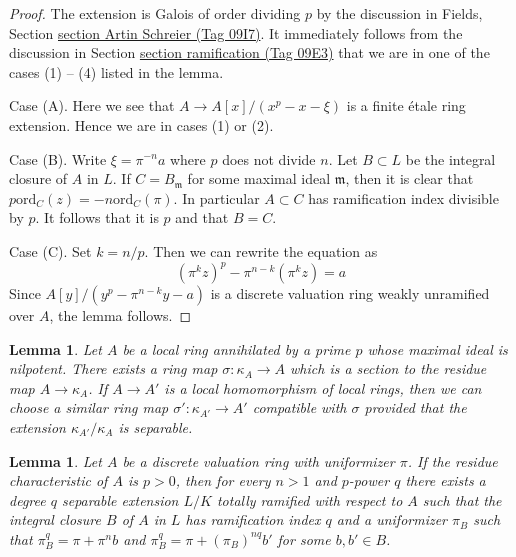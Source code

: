 \documentclass{amsart}
\theoremstyle{plain}
\newtheorem{lemma}[subsection]{Lemma}
\theoremstyle{definition}
\theoremstyle{remark}
\numberwithin{equation}{subsection}
\begin{document}
\begin{proof}
The extension is Galois of order dividing $p$ by the discussion in
Fields, Section \href{https://stacks.math.columbia.edu/tag/09I7}{section Artin Schreier (Tag 09I7)}.
It immediately follows from the discussion in
Section \href{https://stacks.math.columbia.edu/tag/09E3}{section ramification (Tag 09E3)} that we are in one of the cases (1) -- (4)
listed in the lemma.

\medskip\noindent
Case (A). Here we see that $A \to A[x]/(x^p - x - \xi)$ is a finite
\'etale ring extension. Hence we are in cases (1) or (2).

\medskip\noindent
Case (B). Write $\xi = \pi^{-n}a$ where $p$ does not divide $n$.
Let $B \subset L$ be the integral closure of $A$ in $L$.
If $C = B_\mathfrak m$ for some maximal ideal $\mathfrak m$,
then it is clear that $p \text{ord}_C(z) = -n \text{ord}_C(\pi)$.
In particular $A \subset C$ has ramification index divisible by $p$.
It follows that it is $p$ and that $B = C$.

\medskip\noindent
Case (C). Set $k = n/p$. Then we can rewrite the equation as
$$
(\pi^kz)^p - \pi^{n - k} (\pi^kz) = a
$$
Since $A[y]/(y^p - \pi^{n - k}y - a)$ is a discrete valuation ring
weakly unramified over $A$, the lemma follows.
\end{proof}


\begin{lemma}
\label{lemma-cohen}
Let $A$ be a local ring annihilated by a prime $p$ whose maximal ideal is
nilpotent. There exists a ring map $\sigma : \kappa_A \to A$
which is a section to the residue map $A \to \kappa_A$. If $A \to A'$ is
a local homomorphism of local rings, then we can choose a similar
ring map $\sigma' : \kappa_{A'} \to A'$ compatible with $\sigma$ provided
that the extension $\kappa_{A'}/\kappa_A$ is separable.
\end{lemma}

\begin{lemma}
\label{lemma-make-degree-q-extension}
Let $A$ be a discrete valuation ring with uniformizer $\pi$. If the residue
characteristic of $A$ is $p > 0$, then for every $n > 1$ and $p$-power $q$
there exists a degree $q$ separable extension $L/K$
totally ramified with respect to $A$
such that the integral closure $B$ of $A$ in $L$ has ramification index
$q$ and a uniformizer $\pi_B$ such that
$\pi_B^q = \pi + \pi^n b$ and $\pi_B^q = \pi + (\pi_B)^{nq}b'$
for some $b, b' \in B$.
\end{lemma}
\end{document}
